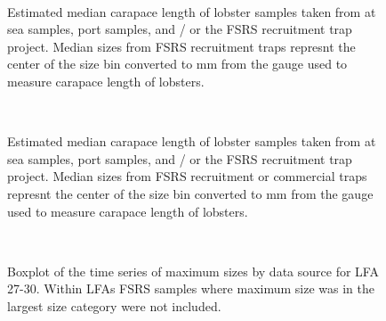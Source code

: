 \documentclass[11pt]{article}
\newcommand{\D}{.}
\newcommand{\e}{/backup/bio_data/bio.lobster/figures/} %
\begin{document}
\begin{landscape}
\begin{figure}
        \centering
         \\
                    
                    \caption{Estimated median carapace length of lobster samples taken from at sea samples, port samples, and / or the FSRS recruitment trap project. Median sizes from FSRS recruitment traps represnt the center of the size bin converted to mm from the gauge used to measure carapace length of lobsters.}
        \end{figure}

\begin{figure}
        \centering
         \\
                    
                    \caption{Estimated median carapace length of lobster samples taken from at sea samples, port samples, and / or the FSRS recruitment trap project. Median sizes from FSRS recruitment or commercial traps represnt the center of the size bin converted to mm from the gauge used to measure carapace length of lobsters. }
        \end{figure}
\end{landscape}

\begin{figure}
        \centering
         \\
                     \caption{Boxplot of the time series of maximum sizes by data source for LFA 27-30. Within LFAs FSRS samples where maximum size was in the largest size category were not included.}
        \end{figure}
\end{document}
